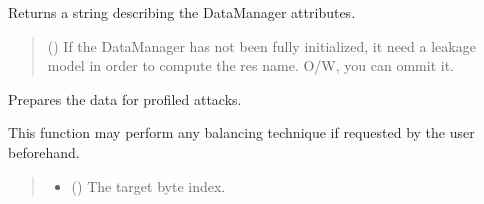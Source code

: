 \documentclass[letterpaper,10pt,english]{sphinxmanual}
\begin{document}
\begin{fulllineitems}
\begin{fulllineitems}
\end{fulllineitems}


\begin{fulllineitems}
\label{\detokenize{MLSCAlib.Data:MLSCAlib.Data.custom_manager.CustomDataManager.get_res_name}}
\pysigstartsignatures
{}
\pysigstopsignatures
\sphinxAtStartPar
Returns a string describing the DataManager attributes.
\begin{quote}\begin{description}
\sphinxAtStartPar
{} ({\hyperref[\detokenize{MLSCAlib.Ciphers:MLSCAlib.Ciphers.leakage_model.LeakageModel}]{}}\sphinxstyleliteralemphasis{\sphinxupquote{, }}) \textendash{} If the DataManager has not been fully initialized, it need a
leakage model in order to compute the res name. O/W,
you can ommit it.

\end{description}\end{quote}

\end{fulllineitems}


\begin{fulllineitems}
\label{\detokenize{MLSCAlib.Data:MLSCAlib.Data.custom_manager.CustomDataManager.prepare_profiled_data}}
\pysigstartsignatures
{}
\pysigstopsignatures
\sphinxAtStartPar
Prepares the data for profiled attacks.

\sphinxAtStartPar
This function may perform any balancing technique if requested by the
user beforehand.
\begin{quote}\begin{description}
\begin{itemize}
\item {} 
\sphinxAtStartPar
{} () \textendash{} The target byte index.


\end{itemize}
\end{description}
\end{quote}
\end{fulllineitems}
\end{fulllineitems}
\end{document}
